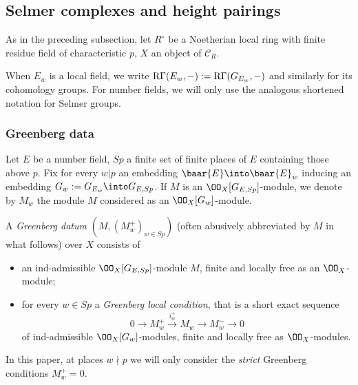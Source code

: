\subsection{Selmer complexes and height pairings}\label{sec: sel} As in the preceding subsection, let $R^{\circ}$ be a Noetherian local ring  with finite residue field  of characteristic $p$,  $X$ an object of $\mathscr{C}_{R}$.

When $E_{w}$ is a local field, we write ${\rm R}\Gamma(E_{w}, -):= {\rm R}\Gamma(G_{E_{w}}, -)$ and similarly for its cohomology groups. For number fields, we will only use the analogous shortened notation for Selmer groups.
\subsubsection{Greenberg data} Let $E$ be a number field, $Sp$  a finite set of finite places of $E$ containing those above $p$.
 Fix for every $w\vert p$ an embedding $\baar{E}\into\baar{ E}_{{w}}$ inducing an embedding $G_{w}:=G_{E_{w}}\into G_{E, Sp}$.
 If $M$ is an $\OO_{X}[G_{E, Sp}]$-module, we   denote by $M_{w}$ the module $M$ considered as an $\OO_{X}[G_{w}]$-module.

 \begin{defi}
\notready\label{grbg datum} A  \emph{Greenberg datum}   $ ( M, (M_{w}^{+})_{w\in  Sp})$ (often abusively abbreviated by $M$ in what follows)  over $X$ consists of
 \begin{itemize}
 \item an ind-admissible  $\OO_{X}[G_{E, Sp}]$-module $M$,   finite and locally free  as an $\OO_{X}$-module;
 \item  for every $w\in Sp$ a \emph{Greenberg local condition}, that is  a short exact sequence $$ 0 \to M_{w}^{+}\stackrel{i_{w}^{+}}{\to} M_{w}\to M_{w}^{-}\to 0$$
of ind-admissible $\OO_{X}[G_{w}]$-modules,  finite and locally free as $\OO_{X}$-modules.
 \end{itemize}
 \end{defi}
 In this paper, at places $w \nmid p$ we will only consider the \emph{strict} Greenberg conditions $M_{w}^{+}=0$.
















